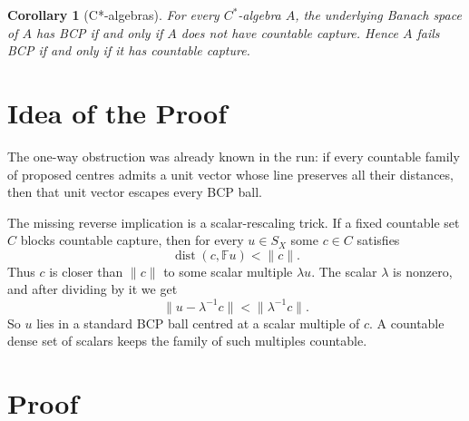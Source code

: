 \documentclass[11pt]{article}
\newtheorem{corollary}{Corollary}
\newcommand{\F}{\mathbb F}
\newcommand{\dist}{\operatorname{dist}}
\begin{document}
\begin{corollary}[C*-algebras]
\label{cor:cstar}
For every \(C^*\)-algebra \(A\), the underlying Banach space of \(A\) has BCP
if and only if \(A\) does not have countable capture.  Hence \(A\) fails BCP
if and only if it has countable capture.
\end{corollary}

\section*{Idea of the Proof}

The one-way obstruction was already known in the run: if every countable
family of proposed centres admits a unit vector whose line preserves all
their distances, then that unit vector escapes every BCP ball.

The missing reverse implication is a scalar-rescaling trick.  If a fixed
countable set \(C\) blocks countable capture, then for every \(u\in S_X\)
some \(c\in C\) satisfies
\[
        \dist(c,\F u)<\|c\|.
\]
Thus \(c\) is closer than \(\|c\|\) to some scalar multiple \(\lambda u\).
The scalar \(\lambda\) is nonzero, and after dividing by it we get
\[
        \|u-\lambda^{-1}c\|<\|\lambda^{-1}c\|.
\]
So \(u\) lies in a standard BCP ball centred at a scalar multiple of \(c\).
A countable dense set of scalars keeps the family of such multiples
countable.

\section*{Proof}
\end{document}

